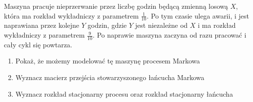 \begin{exercise}
	Maszyna pracuje nieprzerwanie przez liczbę godzin będącą zmienną losową \( X \), która ma rozkład wykładniczy z parametrem \( \frac{1}{10} \).
	Po tym czasie ulega awarii, i jest naprawiana przez kolejne \( Y \) godzin, gdzie \( Y \) jest niezależne od \( X \) i ma rozkład wykładniczy z parametrem \( \frac{9}{10} \).
	Po naprawie maszyna zaczyna od razu pracować i cały cykl się powtarza.

	\begin{enumerate}
		\item Pokaż, że możemy modelować tę maszynę procesem Markowa
		\item Wyznacz macierz przejścia stowarzyszonego łańcucha Markowa
		\item Wyznacz rozkład stacjonarny procesu oraz rozkład stacjonarny łańcucha
	\end{enumerate}
\end{exercise}
